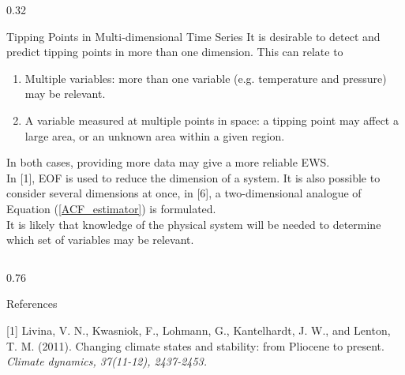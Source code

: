 \documentclass[11pt, final]{beamer}
\begin{document}
\begin{frame}{}
\begin{columns}[T]
   	
   		\begin{column}{0.32\textwidth}
   			\begin{block}{Tipping Points in Multi-dimensional Time Series} 
   			It is desirable to detect and predict tipping points in more than one dimension. This can relate to
   			\vspace{0.5cm}
   			\setlength{\leftmargini}{4em}
   				\begin{enumerate}
   				\item Multiple variables: more than one variable (e.g. temperature and pressure) may be relevant.
   				\item A variable measured at multiple points in space: a tipping point may affect a large area, or an unknown area within a given region.
   				\end{enumerate}
   				\vspace{0.5cm}
   			In both cases, providing more data may give a more reliable EWS. \\
   			\vspace{0.5cm}
   			In [1], EOF is used to reduce the dimension of a system. It is also possible to consider several dimensions at once, in [6], a two-dimensional analogue of Equation (\ref{ACF_estimator}) is formulated.\\
   			\vspace{0.5cm}
   			It is likely that knowledge of the physical system will be needed to determine which set of variables may be relevant. 
   			\end{block}
   		\end{column} 
   	
   	\end{columns}
   	
   	
   	
   	
   	
   	
   	
   	
   	
   	
   	\vskip1cm
   	\begin{columns}[T]
    		\begin{column}{0.76\textwidth}
    			\begin{block}{References}
    			        \footnotesize{
        
 [1] Livina, V. N., Kwasniok, F., Lohmann, G., Kantelhardt, J. W., and Lenton, T. M. (2011). Changing climate states and stability: from Pliocene to present. {\it \footnotesize Climate dynamics, 37(11-12), 2437-2453.}
        
}
\end{block}
\end{column}
\end{columns}
\end{frame}
\end{document}
